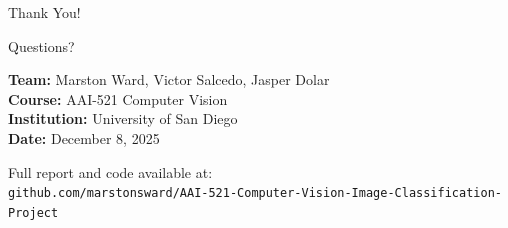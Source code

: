 \documentclass[aspectratio=169]{beamer}
\begin{document}
\begin{frame}[plain]
    \begin{center}
        \Huge Thank You!
        
        \vspace{1cm}
        \Large Questions?
        
        \vspace{1cm}
        \normalsize
        \textbf{Team:} Marston Ward, Victor Salcedo, Jasper Dolar\\
        \textbf{Course:} AAI-521 Computer Vision\\
        \textbf{Institution:} University of San Diego\\
        \textbf{Date:} December 8, 2025
        
        \vspace{0.5cm}
        \small
        Full report and code available at:\\
        \texttt{github.com/marstonsward/AAI-521-Computer-Vision-Image-Classification-Project}
    \end{center}
\end{frame}
\end{document}
